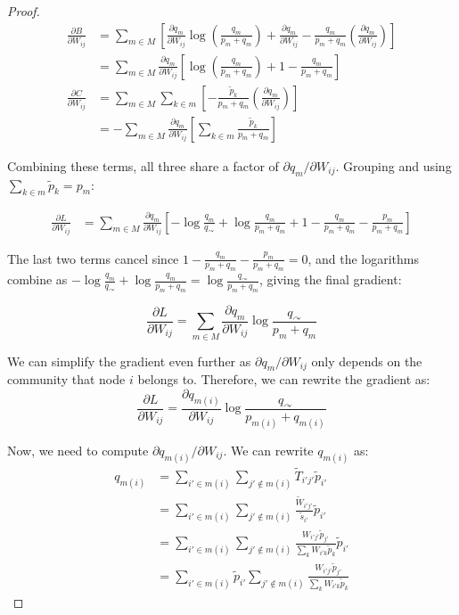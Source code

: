 \documentclass[pdflatex,sn-mathphys-num]{sn-jnl}%
\theoremstyle{thmstyleone}%
\theoremstyle{thmstyletwo}%
\theoremstyle{thmstylethree}%
\begin{document}
\begin{appendices}
\begin{proof}
\begin{align*}
\frac{\partial B}{\partial W_{ij}} &= \sum_{m \in M} \left[ \frac{\partial q_m}{\partial W_{ij}} \log \left( \frac{q_m}{p_m + q_m} \right) + \frac{\partial q_m}{\partial W_{ij}} - \frac{q_m}{p_m + q_m} \left(\frac{\partial q_m}{\partial W_{ij}} \right) \right] \\
&= \sum_{m \in M} \frac{\partial q_m}{\partial W_{ij}} \left[ \log \left( \frac{q_m}{p_m + q_m} \right) + 1 - \frac{q_m}{p_m + q_m} \right] \\
\frac{\partial C}{\partial W_{ij}} &= \sum_{m \in M} \sum_{k \in m} \left[ - \frac{\tilde{p}_k}{p_m + q_m} \left(\frac{\partial q_m}{\partial W_{ij}} \right) \right] \\
&= - \sum_{m \in M} \frac{\partial q_m}{\partial W_{ij}} \left[\sum_{k \in m} \frac{\tilde{p}_k}{p_m + q_m} \right]
\end{align*}

Combining these terms, all three share a factor of $\partial q_m / \partial W_{ij}$. Grouping and using $\sum_{k \in m} \tilde{p}_k = p_m$:

\begin{align*}
\frac{\partial L}{\partial W_{ij}} &= \sum_{m \in M} \frac{\partial q_m}{\partial W_{ij}} \left[ -\log \frac{q_m}{q_{\curvearrowright}} + \log \frac{q_m}{p_m + q_m} + 1 - \frac{q_m}{p_m + q_m} - \frac{p_m}{p_m + q_m} \right]
\end{align*}

The last two terms cancel since $1 - \frac{q_m}{p_m+q_m} - \frac{p_m}{p_m+q_m} = 0$, and the logarithms combine as $-\log\frac{q_m}{q_{\curvearrowright}} + \log\frac{q_m}{p_m+q_m} = \log\frac{q_{\curvearrowright}}{p_m+q_m}$, giving the final gradient:

$$\frac{\partial L}{\partial W_{ij}} = \sum_{m \in M} \frac{\partial q_m}{\partial W_{ij}} \log \frac{q_{\curvearrowright}}{p_m + q_m}$$

We can simplify the gradient even further as $\partial q_m / \partial W_{ij}$ only depends on the community that node $i$ belongs to. Therefore, we can rewrite the gradient as:
$$\frac{\partial L}{\partial W_{ij}} = \frac{\partial q_{m(i)}}{\partial W_{ij}} \log \frac{q_{\curvearrowright}}{p_{m(i)} + q_{m(i)}}$$

Now, we need to compute $\partial q_{m(i)} / \partial W_{ij}$. We can rewrite $q_{m(i)}$ as:
\begin{align*}
q_{m(i)} &= \sum_{i' \in m(i)} \sum_{j' \notin m(i)} \tilde{T}_{i'j'} \tilde{p}_{i'} \\
&= \sum_{i' \in m(i)} \sum_{j' \notin m(i)} \frac{\tilde{W}_{i'j'}}{\tilde{s}_{i'}} \tilde{p}_{i'} \\
&= \sum_{i' \in m(i)} \sum_{j' \notin m(i)} \frac{W_{i'j'} \tilde{p}_{j'}}{\sum_k W_{i'k} \tilde{p}_k} \tilde{p}_{i'} \\
&= \sum_{i'\in m(i)} \tilde{p}_{i'} \sum_{j' \notin m(i)} \frac{W_{i'j'} \tilde{p}_{j'}}{\sum_k W_{i'k} \tilde{p}_k}
\end{align*}


\end{proof}
\end{appendices}
\end{document}
